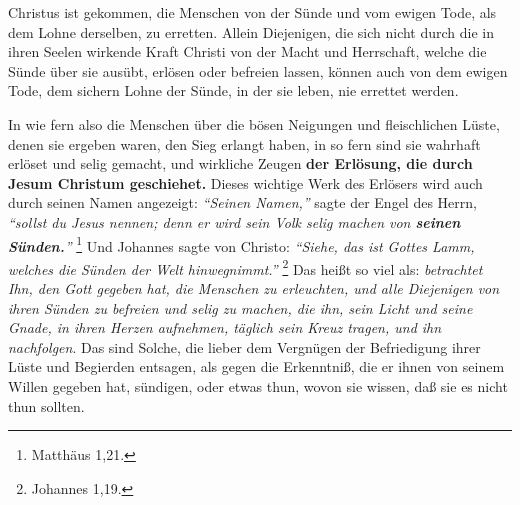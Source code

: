 \medskip

Christus ist gekommen, die Menschen von der Sünde und vom ewigen Tode, als dem
Lohne derselben, zu erretten.
Allein Diejenigen, die sich nicht durch die in ihren Seelen wirkende Kraft
Christi von der Macht und Herrschaft, welche die Sünde über sie ausübt, erlösen
oder befreien lassen, können auch von dem ewigen Tode, dem sichern Lohne der
Sünde, in der sie leben, nie errettet werden.

\medskip 

In wie fern also die Menschen über die bösen Neigungen und fleischlichen Lüste,
denen sie ergeben waren, den Sieg erlangt haben, in so fern sind sie wahrhaft
erlöset und selig gemacht, und wirkliche Zeugen \textbf{der Erlösung, die durch
Jesum Christum geschiehet.}
Dieses wichtige Werk des Erlösers wird auch durch seinen Namen angezeigt:
\textit{"`Seinen Namen,"'} sagte der Engel des Herrn, \textit{"`sollst du Jesus
nennen; denn er wird sein Volk selig machen von \textbf{seinen
Sünden.}"'}
\footnote{Matthäus 1,21.}
Und Johannes sagte von Christo:
\textit{"`Siehe, das ist Gottes Lamm, welches die Sünden der Welt hinwegnimmt."'}
\footnote{Johannes 1,19.}
Das heißt so viel als:
\textit{betrachtet Ihn, den Gott gegeben hat, die Menschen zu erleuchten, und
alle Diejenigen von ihren Sünden zu befreien und selig zu machen, die ihn, sein
Licht und seine Gnade, in ihren Herzen aufnehmen, täglich sein Kreuz tragen, und
ihn nachfolgen}.
Das sind Solche, die lieber dem Vergnügen der Befriedigung ihrer Lüste und
Begierden entsagen, als gegen die Erkenntniß, die er ihnen von seinem Willen
gegeben hat, sündigen, oder etwas thun, wovon sie wissen, daß sie es nicht thun
sollten.




